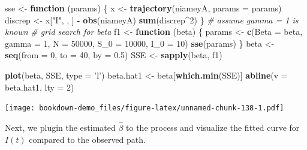 \documentclass[]{book}
\newenvironment{Shaded}{\begin{snugshade}}{\end{snugshade}}
\newcommand{\KeywordTok}[1]{\textcolor[rgb]{0.13,0.29,0.53}{\textbf{#1}}}
\newcommand{\DataTypeTok}[1]{\textcolor[rgb]{0.13,0.29,0.53}{#1}}
\newcommand{\DecValTok}[1]{\textcolor[rgb]{0.00,0.00,0.81}{#1}}
\newcommand{\FloatTok}[1]{\textcolor[rgb]{0.00,0.00,0.81}{#1}}
\newcommand{\StringTok}[1]{\textcolor[rgb]{0.31,0.60,0.02}{#1}}
\newcommand{\CommentTok}[1]{\textcolor[rgb]{0.56,0.35,0.01}{\textit{#1}}}
\newcommand{\ControlFlowTok}[1]{\textcolor[rgb]{0.13,0.29,0.53}{\textbf{#1}}}
\newcommand{\OperatorTok}[1]{\textcolor[rgb]{0.81,0.36,0.00}{\textbf{#1}}}
\newcommand{\NormalTok}[1]{#1}
\begin{document}
\begin{Shaded}
\begin{Highlighting}[]
\NormalTok{sse <-}\StringTok{ }\ControlFlowTok{function}\NormalTok{ (params) \{}
\NormalTok{  x <-}\StringTok{ }\KeywordTok{trajectory}\NormalTok{(niameyA, }\DataTypeTok{params =}\NormalTok{ params)}
\NormalTok{  discrep <-}\StringTok{ }\NormalTok{x[}\StringTok{"I"}\NormalTok{, , ] }\OperatorTok{-}\StringTok{ }\KeywordTok{obs}\NormalTok{(niameyA)}
  \KeywordTok{sum}\NormalTok{(discrep}\OperatorTok{^}\DecValTok{2}\NormalTok{)}
\NormalTok{\}}
\CommentTok{# assume gamma = 1 is known}
\CommentTok{# grid search for beta}
\NormalTok{f1 <-}\StringTok{ }\ControlFlowTok{function}\NormalTok{ (beta) \{}
\NormalTok{  params <-}\StringTok{ }\KeywordTok{c}\NormalTok{(}\DataTypeTok{Beta =}\NormalTok{ beta, }\DataTypeTok{gamma =} \DecValTok{1}\NormalTok{, }\DataTypeTok{N =} \DecValTok{50000}\NormalTok{, }\DataTypeTok{S_0 =} \DecValTok{10000}\NormalTok{, }\DataTypeTok{I_0 =} \DecValTok{10}\NormalTok{)}
  \KeywordTok{sse}\NormalTok{(params)}
\NormalTok{\}}
\NormalTok{beta <-}\StringTok{ }\KeywordTok{seq}\NormalTok{(}\DataTypeTok{from =} \DecValTok{0}\NormalTok{, }\DataTypeTok{to =} \DecValTok{40}\NormalTok{, }\DataTypeTok{by =} \FloatTok{0.5}\NormalTok{)}
\NormalTok{SSE <-}\StringTok{ }\KeywordTok{sapply}\NormalTok{(beta, f1)}

\KeywordTok{plot}\NormalTok{(beta, SSE, }\DataTypeTok{type =} \StringTok{'l'}\NormalTok{)}
\NormalTok{beta.hat1 <-}\StringTok{ }\NormalTok{beta[}\KeywordTok{which.min}\NormalTok{(SSE)]}
\KeywordTok{abline}\NormalTok{(}\DataTypeTok{v =}\NormalTok{ beta.hat1, }\DataTypeTok{lty =} \DecValTok{2}\NormalTok{)}
\end{Highlighting}
\end{Shaded}

\texttt{[image: bookdown-demo\_files/figure-latex/unnamed-chunk-138-1.pdf]}

Next, we plugin the estimated \(\hat{\beta}\) to the process and
visualize the fitted curve for \(I(t)\) compared to the observed path.
\end{document}

